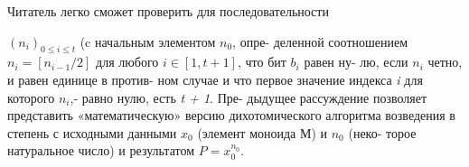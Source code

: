 Читатель легко сможет проверить для последовательности
$(n_{i})_{0 \leqslant i \leqslant t}$ (c начальным элементом $n_{0}$, опре-\linebreak
деленной соотношением $n_{i} = [n_{i-1} / 2]$ для \linebreak
любого \textit{$i \in [1,t + 1]$}, что бит $b_{i}$ равен ну-\linebreak
лю, если $n_{i}$ четно, и равен единице в против­-\linebreak
ном случае и что первое значение индекса \textit{i} \linebreak
для которого \textit{$n_{i}$},- равно нулю, есть \textit{t + 1}. Пре­-\linebreak
дыдущее рассуждение позволяет представить\linebreak
«математическую» версию дихотомического\linebreak
алгоритма возведения в степень с исходными\linebreak
данными $x_{0}$ (элемент моноида М) и $n_{0}$ (неко­-\linebreak
торое натуральное число) и результатом \textit{$P = x_{0}^{n_{0}}$}.
\newline

